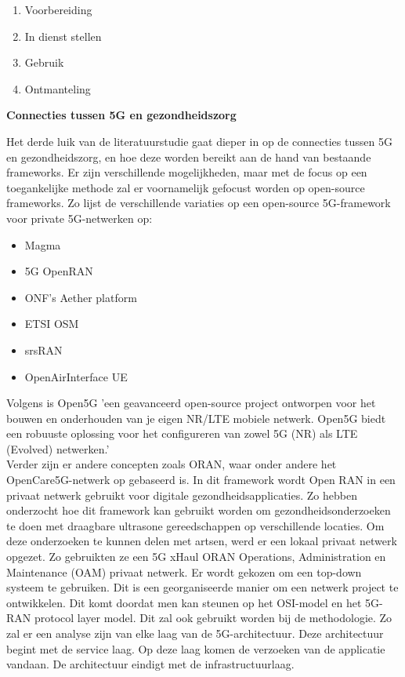 \begin{enumerate}
  \item Voorbereiding
  \item In dienst stellen
  \item Gebruik
  \item Ontmanteling
\end{enumerate}

\textbf{Connecties tussen 5G en gezondheidszorg}

Het derde luik van de literatuurstudie gaat dieper in op de connecties tussen 5G en gezondheidszorg, en hoe deze worden bereikt aan de hand van bestaande frameworks. Er zijn verschillende mogelijkheden, maar met de focus op een toegankelijke methode zal er voornamelijk gefocust worden op open-source frameworks. Zo lijst \textcite{Eswaran2022} de verschillende variaties op een open-source 5G-framework voor private 5G-netwerken op:

\begin{itemize}
  \item Magma
  \item 5G OpenRAN
  \item ONF's Aether platform
  \item ETSI OSM
  \item srsRAN
  \item OpenAirInterface UE
\end{itemize}

Volgens \textcite{Open5GS2024} is Open5G 'een geavanceerd open-source project ontworpen voor het bouwen en onderhouden van je eigen NR/LTE mobiele netwerk. Open5G biedt een robuuste oplossing voor het configureren van zowel 5G (NR) als LTE (Evolved) netwerken.' \\ Verder zijn er andere concepten zoals ORAN, waar onder andere het OpenCare5G-netwerk op gebaseerd is. In dit framework wordt Open RAN in een privaat netwerk gebruikt voor digitale gezondheidsapplicaties. Zo hebben \textcite{de2023opencare5g} onderzocht hoe dit framework kan gebruikt worden om gezondheidsonderzoeken te doen met draagbare ultrasone gereedschappen op verschillende locaties. Om deze onderzoeken te kunnen delen met artsen, werd er een lokaal privaat netwerk opgezet. Zo gebruikten ze een 5G xHaul ORAN Operations, Administration en Maintenance (OAM) privaat netwerk. Er wordt gekozen om een top-down systeem te gebruiken. Dit is een georganiseerde manier om een netwerk project te ontwikkelen. Dit komt doordat men kan steunen op het OSI-model en het 5G-RAN protocol layer model. Dit zal ook gebruikt worden bij de methodologie. Zo zal er een analyse zijn van elke laag van de 5G-architectuur. Deze architectuur begint met de service laag. Op deze laag komen de verzoeken van de applicatie vandaan. De architectuur eindigt met de infrastructuurlaag. \autocite{de2023opencare5g}


